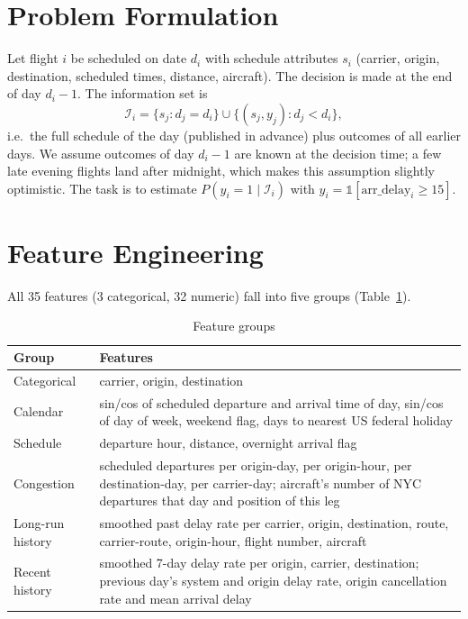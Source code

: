 \documentclass[conference]{IEEEtran}
\begin{document}
\section{Problem Formulation}
Let flight $i$ be scheduled on date $d_i$ with schedule attributes $s_i$ (carrier,
origin, destination, scheduled times, distance, aircraft). The decision is made at the
end of day $d_i - 1$. The information set is
\begin{equation}
\mathcal{I}_i = \{ s_j : d_j = d_i \} \cup \{ (s_j, y_j) : d_j < d_i \},
\end{equation}
i.e.\ the full schedule of the day (published in advance) plus outcomes of all earlier
days. We assume outcomes of day $d_i - 1$ are known at the decision time; a few late
evening flights land after midnight, which makes this assumption slightly optimistic.
The task is to estimate $P(y_i = 1 \mid \mathcal{I}_i)$ with $y_i = \mathbb{1}[\text{arr\_delay}_i \ge 15]$.

\section{Feature Engineering}
All 35 features (3 categorical, 32 numeric) fall into five groups (Table~\ref{tab:features}).

\begin{table}[t]
\caption{Feature groups}
\label{tab:features}
\centering
\small
\begin{tabular}{p{}p{}}
\toprule
Group & Features \\
\midrule
Categorical & carrier, origin, destination \\
Calendar & sin/cos of scheduled departure and arrival time of day, sin/cos of day of week, weekend flag, days to nearest US federal holiday \\
Schedule & departure hour, distance, overnight arrival flag \\
Congestion & scheduled departures per origin-day, per origin-hour, per destination-day, per carrier-day; aircraft's number of NYC departures that day and position of this leg \\
Long-run history & smoothed past delay rate per carrier, origin, destination, route, carrier-route, origin-hour, flight number, aircraft \\
Recent history & smoothed 7-day delay rate per origin, carrier, destination; previous day's system and origin delay rate, origin cancellation rate and mean arrival delay \\
\bottomrule
\end{tabular}
\end{table}
\end{document}
